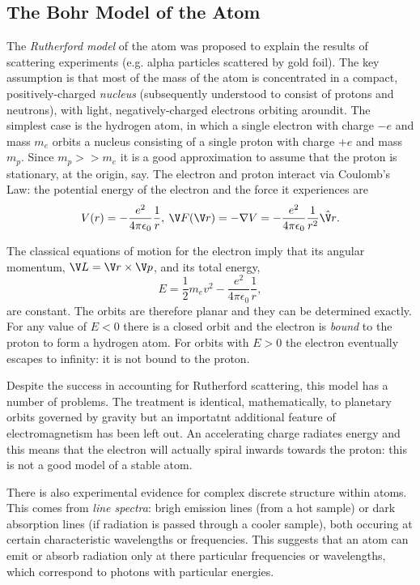 \documentclass[a4paper]{article}
\theoremstyle{definition}
\begin{document}
\subsection{The Bohr Model of the Atom}

The \emph{Rutherford model} of the atom was proposed to explain the results of scattering experiments (e.g. alpha particles scattered by gold foil). The key assumption is that most of the mass of the atom is concentrated in a compact, positively-charged \emph{nucleus} (subsequently understood to consist of protons and neutrons), with light, negatively-charged electrons orbiting aroundit. The simplest case is the hydrogen atom, in which a single electron with charge $-e$ and mass $m_e$ orbits a nucleus consisting of a single proton with charge $+e$ and mass $m_p$. Since $m_p >> m_e$ it is a good approximation to assume that the proton is stationary, at the origin, say. The electron and proton interact via Coulomb's Law: the potential energy of the electron and the force it experiences are
\[
  V(r) = -\frac{e^2}{4\pi \epsilon_0} \frac{1}{r},\: \V F(\V r) = -\nabla V = -\frac{e^2}{4\pi \epsilon_0}\frac{1}{r^2} \hat{\V r}.
\]

The classical equations of motion for the electron imply that its angular momentum, $\V L = \V r \times \V p$, and its total energy,
\[
  E=\frac{1}{2}m_e v^2 - \frac{e^2}{4\pi\epsilon_0}\frac{1}{r},
\]
are constant. The orbits are therefore planar and they can be determined exactly. For any value of $E<0$ there is a closed orbit and the electron is \emph{bound} to the proton to form a hydrogen atom. For orbits with $E>0$ the electron eventually escapes to infinity: it is not bound to the proton.

Despite the success in accounting for Rutherford scattering, this model has a number of problems. The treatment is identical, mathematically, to planetary orbits governed by gravity but an importatnt additional feature of electromagnetism has been left out. An accelerating charge radiates energy and this means that the electron will actually spiral inwards towards the proton: this is not a good model of a stable atom.

There is also experimental evidence for complex discrete structure within atoms. This comes from \emph{line spectra}: brigh emission lines (from a hot sample) or dark absorption lines (if radiation is passed through a cooler sample), both occuring at certain characteristic wavelengths or frequencies. This suggests that an atom can emit or absorb radiation only at there particular frequencies or wavelengths, which correspond to photons with particular energies.
\end{document}
